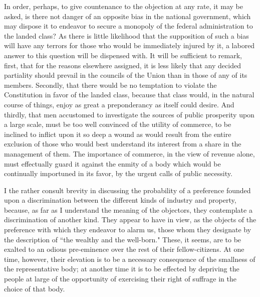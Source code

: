 In order, perhaps, to give countenance to the objection at any rate, it may be asked, is there not danger of an opposite bias in the national government, which may dispose it to endeavor to secure a monopoly of the federal administration to the landed class? 
As there is little likelihood that the supposition of such a bias will have any terrors for those who would be immediately injured by it, a labored answer to this question will be dispensed with. 
It will be sufficient to remark, first, that for the reasons elsewhere assigned, it is less likely that any decided partiality should prevail in the councils of the Union than in those of any of its members. 
Secondly, that there would be no temptation to violate the Constitution in favor of the landed class, because that class would, in the natural course of things, enjoy as great a preponderancy as itself could desire. 
And thirdly, that men accustomed to investigate the sources of public prosperity upon a large scale, must be too well convinced of the utility of commerce, to be inclined to inflict upon it so deep a wound as would result from the entire exclusion of those who would best understand its interest from a share in the management of them. 
The importance of commerce, in the view of revenue alone, must effectually guard it against the enmity of a body which would be continually importuned in its favor, by the urgent calls of public necessity.

I the rather consult brevity in discussing the probability of a preference founded upon a discrimination between the different kinds of industry and property, because, as far as I understand the meaning of the objectors, they contemplate a discrimination of another kind. 
They appear to have in view, as the objects of the preference with which they endeavor to alarm us, those whom they designate by the description of ``the wealthy and the well-born." These, it seems, are to be exalted to an odious pre-eminence over the rest of their fellow-citizens. 
At one time, however, their elevation is to be a necessary consequence of the smallness of the representative body; at another time it is to be effected by depriving the people at large of the opportunity of exercising their right of suffrage in the choice of that body.

